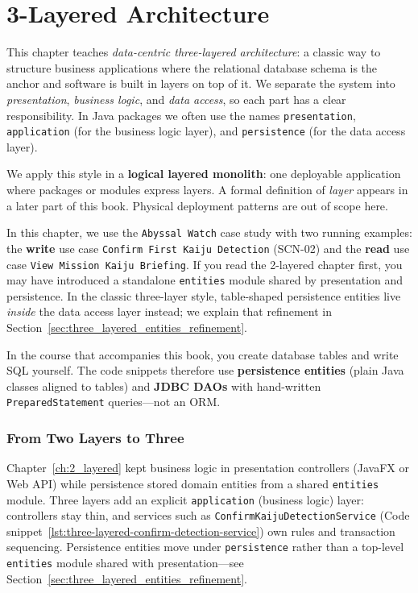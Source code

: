 \chapter{3-Layered Architecture}
\label{ch:three_layered}

This chapter teaches \textit{data-centric three-layered architecture}: a classic way to structure business applications where the relational database schema is the anchor and software is built in layers on top of it.\autocite{microsoft2003layered,microsoftThreeTier} We separate the system into \textit{presentation}, \textit{business logic}, and \textit{data access}, so each part has a clear responsibility. In Java packages we often use the names \texttt{presentation}, \texttt{application} (for the business logic layer), and \texttt{persistence} (for the data access layer).

We apply this style in a \textbf{logical layered monolith}: one deployable application where packages or modules express layers. A formal definition of \textit{layer} appears in a later part of this book. Physical deployment patterns are out of scope here.

In this chapter, we use the \texttt{Abyssal Watch} case study with two running examples: the \textbf{write} use case \texttt{Confirm First Kaiju Detection} (SCN-02) and the \textbf{read} use case \texttt{View Mission Kaiju Briefing}. If you read the 2-layered chapter first, you may have introduced a standalone \texttt{entities} module shared by presentation and persistence. In the classic three-layer style, table-shaped persistence entities live \textit{inside} the data access layer instead; we explain that refinement in Section~\ref{sec:three_layered_entities_refinement}.

In the course that accompanies this book, you create database tables and write SQL yourself. The code snippets therefore use \textbf{persistence entities} (plain Java classes aligned to tables) and \textbf{JDBC DAOs} with hand-written \texttt{PreparedStatement} queries---not an ORM.

\subsection{From Two Layers to Three}
\label{sec:three_layered_from_two_layer}

Chapter~\ref{ch:2_layered} kept business logic in presentation controllers (JavaFX or Web API) while persistence stored domain entities from a shared \texttt{entities} module. Three layers add an explicit \texttt{application} (business logic) layer: controllers stay thin, and services such as \texttt{ConfirmKaijuDetectionService} (Code snippet~\ref{lst:three-layered-confirm-detection-service}) own rules and transaction sequencing. Persistence entities move under \texttt{persistence} rather than a top-level \texttt{entities} module shared with presentation---see Section~\ref{sec:three_layered_entities_refinement}.

